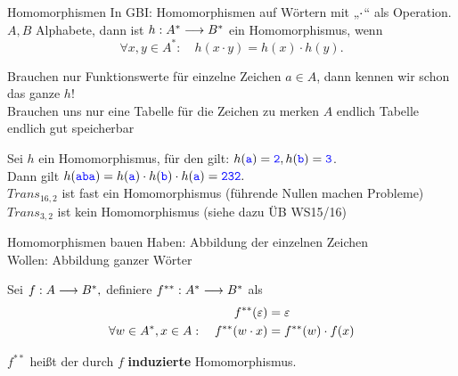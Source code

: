 \begin{frame}{Homomorphismen}
	In GBI: Homomorphismen auf Wörtern mit „$\cdot$“ als Operation.\\
	\impl $A, B$ Alphabete, dann ist $h: A^* \longrightarrow B^*$ ein Homomorphismus, wenn
	$$ \forall x, y \in A^* : \quad h(x \cdot y) = h(x) \cdot h(y). $$
	
	\pause
	\impl Brauchen nur Funktionswerte für einzelne Zeichen $a \in A$, dann kennen wir schon das ganze $h$! \\
	\impl Brauchen uns nur eine Tabelle für die Zeichen zu merken 
	\impl $A$ endlich \impl Tabelle endlich \impl gut speicherbar
	
	\pause
	\begin{Beispiel}
		Sei $h$ ein Homomorphismus, für den gilt: $h(\hbox{\textcolor{blue}{\texttt{a}}}) = \hbox{\textcolor{blue}{\texttt{2}}}, h(\hbox{\textcolor{blue}{\texttt{b}}}) = \hbox{\textcolor{blue}{\texttt{3}}}$. \\
		Dann gilt $h(\hbox{\textcolor{blue}{\texttt{aba}}}) = h(\hbox{\textcolor{blue}{\texttt{a}}}) \cdot h(\hbox{\textcolor{blue}{\texttt{b}}}) \cdot h(\hbox{\textcolor{blue}{\texttt{a}}}) = \hbox{\textcolor{blue}{\texttt{232}}}. $ \\[0.5em]
		$Trans_{16,2}$ ist fast ein Homomorphismus (führende Nullen machen Probleme)\\
		$Trans_{3,2}$ ist kein Homomorphismus (siehe dazu ÜB WS15/16)
	\end{Beispiel}
\end{frame}

\begin{frame}{Homomorphismen bauen}
	Haben: Abbildung der einzelnen Zeichen \\
	Wollen: Abbildung ganzer Wörter 
	\begin{Definition}
		Sei $f: A \longrightarrow B^*,$ \pause definiere $f^{**}:A^* \longrightarrow B^*$ als
		\begin{align*}
		f^{**}(\varepsilon) &= \varepsilon  \\
		\forall w\in A^*, x\in A: \quad  f^{**}(w \cdot x) &= f^{**}(w) \cdot f(x)       
		\end{align*}
	\end{Definition}

	$f^{**}$ heißt der durch $f$ \textbf{induzierte} Homomorphismus.
\end{frame}

